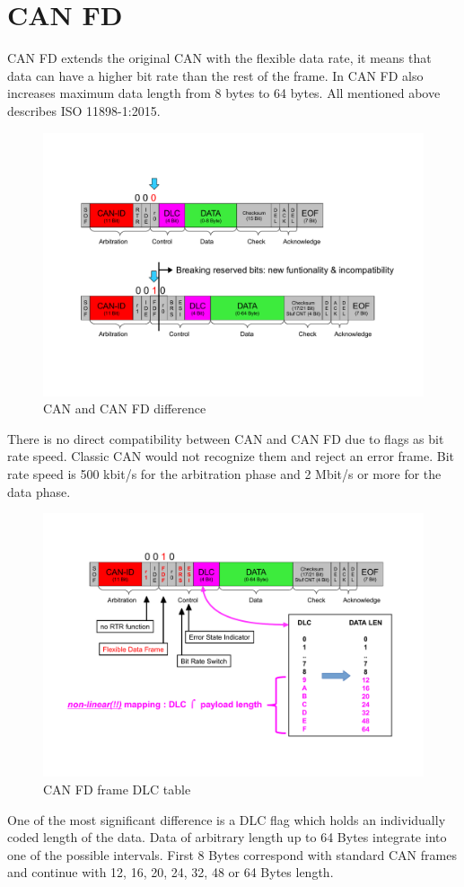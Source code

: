 \documentclass{ctuthesis}
\begin{document}
 \section{CAN FD}
 CAN FD extends the original CAN with the flexible data rate, it means that data can have a higher bit rate than the rest of the frame. In CAN FD also increases maximum data length from 8 bytes to 64 bytes. All mentioned above describes ISO 11898-1:2015.
 \begin{figure}[H]
 \includegraphics[width=1\textwidth]{agl2017-socketcan-can_fd}
 \caption{CAN and CAN FD difference \cite{canfd}}
 \end{figure}
 There is no direct compatibility between CAN and CAN FD due to flags as bit rate speed. Classic CAN would not recognize them and reject an error frame. Bit rate speed is 500 kbit/s for the arbitration phase and 2 Mbit/s or more for the data phase.
 \begin{figure}[H]
 \includegraphics[width=1\textwidth]{agl2017-socketcan-can_fd_dlc}
 \caption{CAN FD frame DLC table \cite{canfd_dlc}}
 \end{figure}
 One of the most significant difference is a DLC flag which holds an individually coded length of the data. Data of arbitrary length up to 64 Bytes integrate into one of the possible intervals. First 8 Bytes correspond with standard CAN frames and continue with 12, 16, 20, 24, 32, 48 or 64 Bytes length.
 
\end{document}
